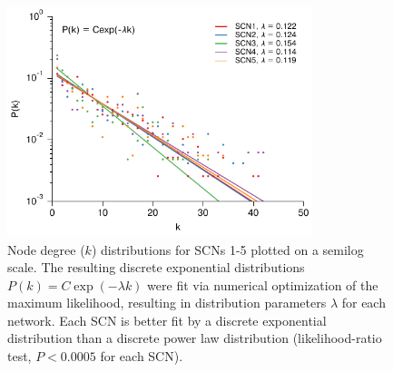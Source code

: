 \begin{figure}[p]
    \begin{center}
        \includegraphics[width=3.5in]{chap3/figures/fig4.pdf}
    \end{center}
    \caption{\label{fig:log} Node degree ($k$) distributions for SCNs 1-5 plotted on a semilog scale. The resulting discrete exponential distributions $P(k) = C\exp(-\lambda k)$ were fit via numerical optimization of the maximum likelihood, resulting in distribution parameters $\lambda$ for each network. Each SCN is better fit by a discrete exponential distribution than a discrete power law distribution (likelihood-ratio test, $P<0.0005$ for each SCN).
}
\end{figure}
